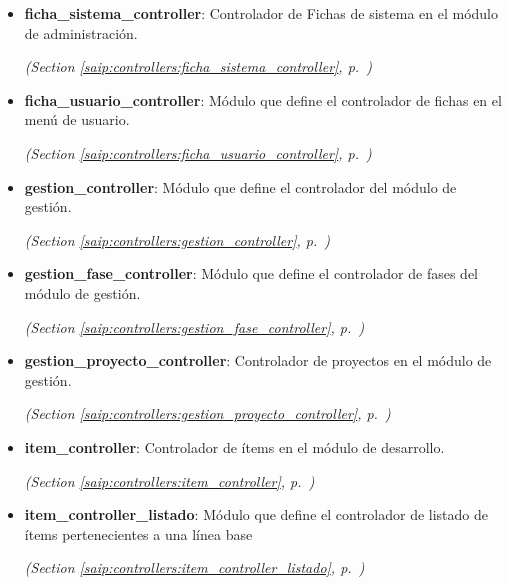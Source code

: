 \begin{itemize}
\item \textbf{ficha\_sistema\_controller}: Controlador de Fichas de sistema en el módulo de administración.



  \textit{(Section \ref{saip:controllers:ficha_sistema_controller}, p.~\pageref{saip:controllers:ficha_sistema_controller})}

\item \textbf{ficha\_usuario\_controller}: Módulo que define el controlador de fichas en el menú de usuario.



  \textit{(Section \ref{saip:controllers:ficha_usuario_controller}, p.~\pageref{saip:controllers:ficha_usuario_controller})}

\item \textbf{gestion\_controller}: Módulo que define el controlador del módulo de gestión.



  \textit{(Section \ref{saip:controllers:gestion_controller}, p.~\pageref{saip:controllers:gestion_controller})}

\item \textbf{gestion\_fase\_controller}: Módulo que define el controlador de fases del módulo de gestión.



  \textit{(Section \ref{saip:controllers:gestion_fase_controller}, p.~\pageref{saip:controllers:gestion_fase_controller})}

\item \textbf{gestion\_proyecto\_controller}: Controlador de proyectos en el módulo de gestión.



  \textit{(Section \ref{saip:controllers:gestion_proyecto_controller}, p.~\pageref{saip:controllers:gestion_proyecto_controller})}

\item \textbf{item\_controller}: Controlador de ítems en el módulo de desarrollo.



  \textit{(Section \ref{saip:controllers:item_controller}, p.~\pageref{saip:controllers:item_controller})}

\item \textbf{item\_controller\_listado}: Módulo que define el controlador de listado de ítems pertenecientes a una 
línea base



  \textit{(Section \ref{saip:controllers:item_controller_listado}, p.~\pageref{saip:controllers:item_controller_listado})}


\end{itemize}
